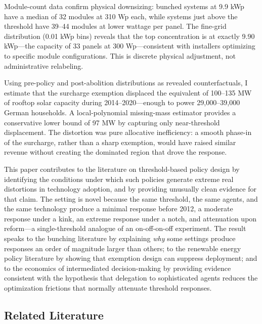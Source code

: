 \documentclass[12pt]{article}
\begin{document}
Module-count data confirm physical downsizing: bunched systems at 9.9 kWp have a median of 32 modules at 310 Wp each, while systems just above the threshold have 39--44 modules at lower wattage per panel. The fine-grid distribution (0.01 kWp bins) reveals that the top concentration is at exactly 9.90 kWp---the capacity of 33 panels at 300 Wp---consistent with installers optimizing to specific module configurations. This is discrete physical adjustment, not administrative relabeling.

Using pre-policy and post-abolition distributions as revealed counterfactuals, I estimate that the surcharge exemption displaced the equivalent of 100--135 MW of rooftop solar capacity during 2014--2020---enough to power 29,000--39,000 German households. A local-polynomial missing-mass estimator provides a conservative lower bound of 97 MW by capturing only near-threshold displacement. The distortion was pure allocative inefficiency: a smooth phase-in of the surcharge, rather than a sharp exemption, would have raised similar revenue without creating the dominated region that drove the response.

This paper contributes to the literature on threshold-based policy design by identifying the conditions under which such policies generate extreme real distortions in technology adoption, and by providing unusually clean evidence for that claim. The setting is novel because the same threshold, the same agents, and the same technology produce a minimal response before 2012, a moderate response under a kink, an extreme response under a notch, and attenuation upon reform---a single-threshold analogue of an on-off-on-off experiment. The result speaks to the bunching literature \citep{saez2010taxpayers, kleven2013using, kleven2016bunching} by explaining \textit{why} some settings produce responses an order of magnitude larger than others; to the renewable energy policy literature \citep{borenstein2012private, hughes2015policy} by showing that exemption design can suppress deployment; and to the economics of intermediated decision-making \citep{chetty2011adjustment} by providing evidence consistent with the hypothesis that delegation to sophisticated agents reduces the optimization frictions that normally attenuate threshold responses.

\subsection*{Related Literature}
\end{document}
